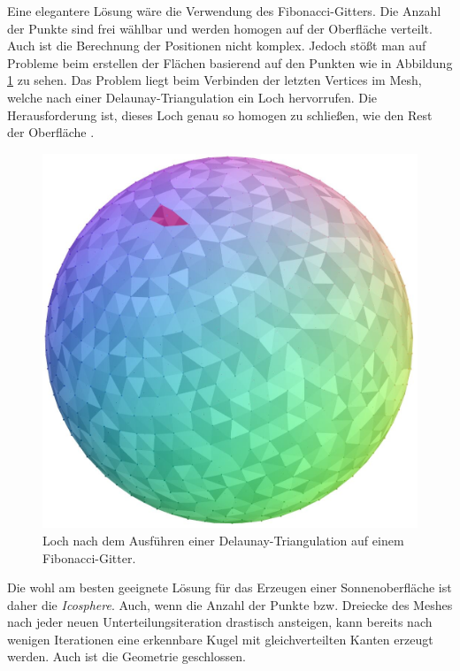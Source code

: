 Eine elegantere Lösung wäre die Verwendung des Fibonacci-Gitters. Die Anzahl
der Punkte sind frei wählbar und werden homogen auf der Oberfläche verteilt.
Auch ist die Berechnung der Positionen nicht komplex. Jedoch stößt man auf
Probleme beim erstellen der Flächen basierend auf den Punkten wie in
Abbildung \ref{fig:fibo-lattice-hole} zu sehen. Das Problem liegt beim
Verbinden der letzten Vertices im Mesh, welche nach einer
Delaunay-Triangulation ein Loch hervorrufen. Die Herausforderung ist, dieses
Loch genau so homogen zu schließen, wie den Rest der Oberfläche
\cite{RedBlobGames}.

\begin{figure}
  \includegraphics[width=\columnwidth]{fibonacci-sphere-hole}
  \caption{Loch nach dem Ausführen einer Delaunay-Triangulation auf einem Fibonacci-Gitter.}
  \label{fig:fibo-lattice-hole}
\end{figure}

Die wohl am besten geeignete Lösung für das Erzeugen einer Sonnenoberfläche
ist daher die \textit{Icosphere}. Auch, wenn die Anzahl der Punkte bzw. Dreiecke
des Meshes nach jeder neuen Unterteilungsiteration drastisch ansteigen, kann bereits
nach wenigen Iterationen eine erkennbare Kugel mit gleichverteilten Kanten erzeugt
werden. Auch ist die Geometrie geschlossen.
